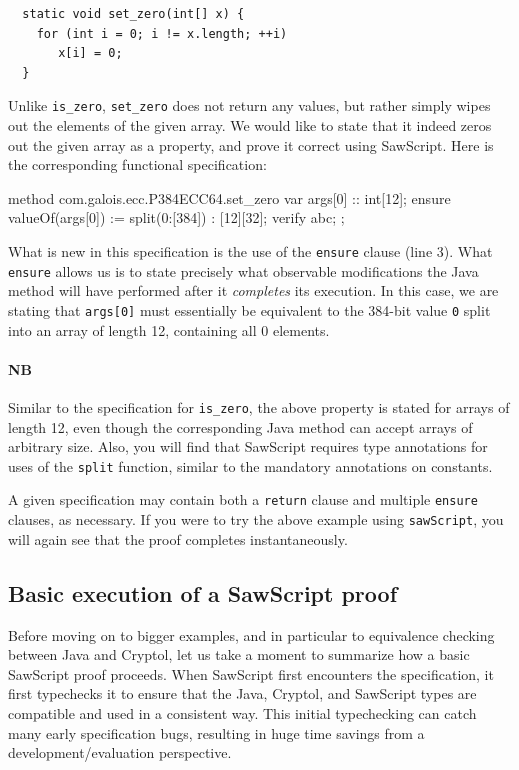 \documentclass[12pt]{galois-whitepaper}
\newcommand{\sawScript}{{\sc SawScript}\xspace}
\begin{document}
\begin{Verbatim}
  static void set_zero(int[] x) {
    for (int i = 0; i != x.length; ++i)
       x[i] = 0;
  }
\end{Verbatim}

Unlike {\tt is\_zero}, {\tt set\_zero} does not return any values, but rather simply wipes out the elements of the given array. We would
like to state that it indeed zeros out the given array as a property, and prove it correct using \sawScript. Here is the corresponding functional specification:
\begin{code}[numbers=left]
  method com.galois.ecc.P384ECC64.set_zero {
    var args[0] :: int[12];
    ensure valueOf(args[0]) := split(0:[384]) : [12][32];
    verify abc;
  };
\end{code}
What is new in this specification is the use of the {\tt ensure} clause (line 3). What {\tt ensure} allows us is to state precisely
what observable modifications the Java method will have performed
after it {\em completes} its execution. In this case, we are stating that {\tt args[0]} must essentially be
equivalent to the 384-bit value {\tt 0} split into an array of length 12, containing all 0 elements.

\paragraph{NB} Similar to the specification for {\tt is\_zero}, the above property is stated for arrays of length
12, even though the corresponding Java method can accept
arrays of arbitrary size. Also, you will find that \sawScript requires type annotations for uses of the {\tt split} function, similar to the
mandatory annotations on constants.

A given specification may contain both a {\tt return} clause and multiple {\tt ensure} clauses, as necessary. If you were to try the
above example using {\tt sawScript}, you will again see that the proof completes instantaneously.

\subsection{Basic execution of a \sawScript proof}\label{sec:proofexec}

Before moving on to bigger examples, and in particular to equivalence checking
between Java and Cryptol, let us take a moment to summarize how a basic
\sawScript proof proceeds. 
When \sawScript first encounters the specification, it first typechecks it
to ensure that the Java, Cryptol, and \sawScript types are compatible and
used in a consistent way.  This initial typechecking can catch many early
specification bugs, resulting in huge time savings from a development/evaluation perspective.
\end{document}
